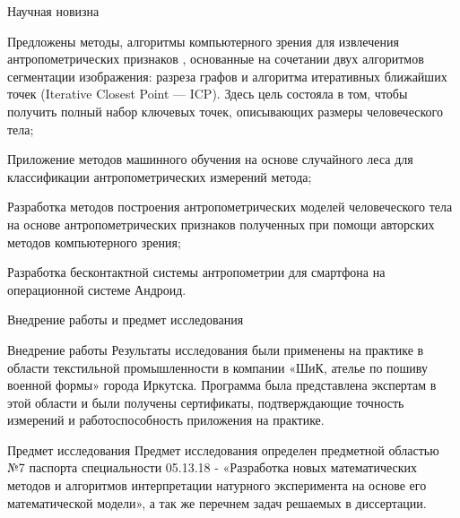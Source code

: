 \documentclass[10pt,pdf,hyperref={unicode},xcolor=table]{beamer}
\begin{document}
\begin{frame}{Научная новизна}
\begin{block}{}
Предложены методы, алгоритмы компьютерного зрения для извлечения антропометрических признаков , основанные на сочетании двух алгоритмов сегментации изображения: разреза графов и алгоритма итеративных ближайших точек (Iterative Closest Point — ICP). Здесь цель состояла в том, чтобы получить полный набор ключевых точек, описывающих размеры человеческого тела;
\end{block}
\begin{block}{}
Приложение методов машинного обучения на основе случайного леса для классификации антропометрических измерений метода;
\end{block}
\begin{block}{}
Разработка методов построения антропометрических моделей человеческого тела на основе антропометрических признаков полученных при помощи авторских методов компьютерного зрения;
\end{block}
\begin{block}{}
Разработка бесконтактной системы антропометрии для смартфона на операционной системе Андроид.
\end{block}
		\end{frame}
\begin{frame}{Внедрение работы и предмет исследования}
	\begin{block}{Внедрение работы}
Результаты исследования были применены на практике в области текстильной промышленности в компании «ШиК, ателье по пошиву военной формы» города Иркутска. Программа была представлена экспертам в этой области и были получены сертификаты, подтверждающие точность измерений и работоспособность приложения на практике.
	\end{block}
	\begin{block}{Предмет исследования}
Предмет исследования определен предметной областью №7 паспорта специальности 05.13.18 - «Разработка новых математических методов и алгоритмов интерпретации натурного эксперимента на основе его математической модели», а так же перечнем задач решаемых в диссертации.
	\end{block}
\end{frame}
\end{document}
